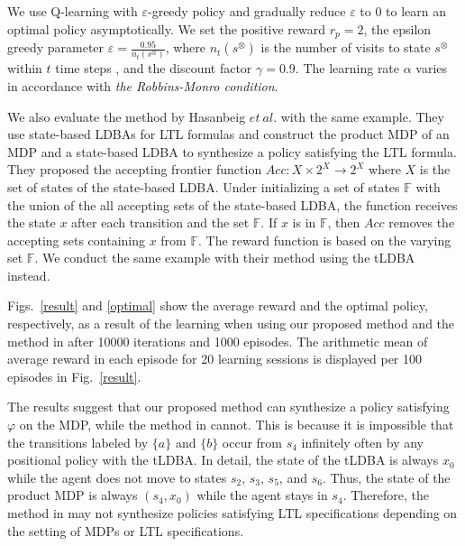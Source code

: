 \documentclass[a4j,12pt,oneside,openany,english]{jsbook}
\begin{document}
We use Q-learning with $\varepsilon$-greedy policy and gradually reduce $\varepsilon$ to 0 to learn an optimal policy asymptotically.
We set the positive reward $r_p = 2$, the epsilon greedy parameter $ \varepsilon = \frac{0.95}{n_t(s^{\otimes})}$, where $n_t(s^{\otimes})$ is the number of visits to state $s^{\otimes}$ within $t$ time steps \cite{Singh1998}, and the discount factor $\gamma = 0.9$. The learning rate $\alpha$ varies in accordance with {\it the Robbins-Monro condition}.

We also evaluate the method by Hasanbeig $et\ al.$\cite{HAK2019} with the same example. They use state-based LDBAs for LTL formulas and construct the product MDP of an MDP and a state-based LDBA to synthesize a policy satisfying the LTL formula. They proposed the accepting frontier function $Acc : X \times 2^X \rightarrow 2^X $ where $X$ is the set of states of the state-based LDBA. Under initializing a set of states $ \mathbb{F} $ with the union of the all accepting sets of the state-based LDBA, the function receives the state $x$ after each transition and the set $\mathbb{F}$. If $x$ is in $\mathbb{F}$, then $Acc$ removes the accepting sets containing $x$ from $\mathbb{F}$. The reward function is based on the varying set $\mathbb{F}$. We conduct the same example with their method using the tLDBA instead.

Figs.\ \ref{result} and \ref{optimal} show the average reward and the optimal policy, respectively, as a result of the learning when using our proposed method and the method in \cite{HAK2019} after 10000 iterations and 1000 episodes. The arithmetic mean of average reward in each episode for 20 learning sessions is displayed per 100 episodes in Fig.\ \ref{result}.

The results suggest that our proposed method can synthesize a policy satisfying $\varphi$ on the MDP, while the method in \cite{HAK2019} cannot. This is because it is impossible that the transitions labeled by $\{ a \}$ and $\{ b \}$ occur from $s_4$ infinitely often by any positional policy with the tLDBA. In detail, the state of the tLDBA is always $x_0$ while the agent does not move to states $s_2$, $s_3$, $s_5$, and $s_6$. Thus, the state of the product MDP is always $(s_4, x_0)$ while the agent stays in $s_4$. Therefore, the method in \cite{HAK2019} may not synthesize policies satisfying LTL specifications depending on the setting of MDPs or LTL specifications.
\end{document}
